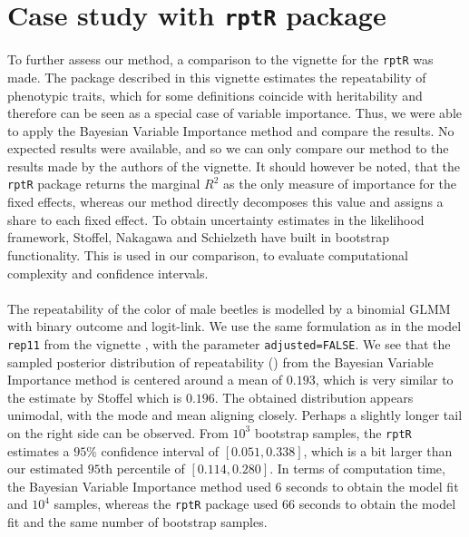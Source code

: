 \section{Case study with \texttt{rptR} package}
To further assess our method, a comparison to the vignette for the \texttt{rptR} was made. The package described in this vignette estimates the repeatability of phenotypic traits, which for some definitions coincide with heritability and therefore can be seen as a special case of variable importance. Thus, we were able to apply the Bayesian Variable Importance method and compare the results. No expected results were available, and so we can only compare our method to the results made by the authors of the vignette. It should however be noted, that the \texttt{rptR} package returns the marginal $R^2$ as the only measure of importance for the fixed effects, whereas our method directly decomposes this value and assigns a share to each fixed effect. To obtain uncertainty estimates in the likelihood framework, Stoffel, Nakagawa and Schielzeth have built in bootstrap functionality. This is used in our comparison, to evaluate computational complexity and confidence intervals.
\\
\\
The repeatability of the color of male beetles is modelled by a binomial GLMM with binary outcome and logit-link. We use the same formulation as in the model \texttt{rep11} from the vignette \citep{Stoffel2017rptR}, with the parameter \texttt{adjusted=FALSE}. We see that the sampled posterior distribution of repeatability () from the Bayesian Variable Importance method is centered around a mean of $0.193$, which is very similar to the estimate by Stoffel which is $0.196$. The obtained distribution appears unimodal, with the mode and mean aligning closely. Perhaps a slightly longer tail on the right side can be observed. From $10^3$ bootstrap samples, the \texttt{rptR} estimates a $95\%$ confidence interval of $[0.051, 0.338]$, which is a bit larger than our estimated $95$th percentile of $[0.114, 0.280]$. In terms of computation time, the Bayesian Variable Importance method used $6$ seconds to obtain the model fit and $10^4$ samples, whereas the \texttt{rptR} package used $66$ seconds to obtain the model fit and the same number of bootstrap samples.
